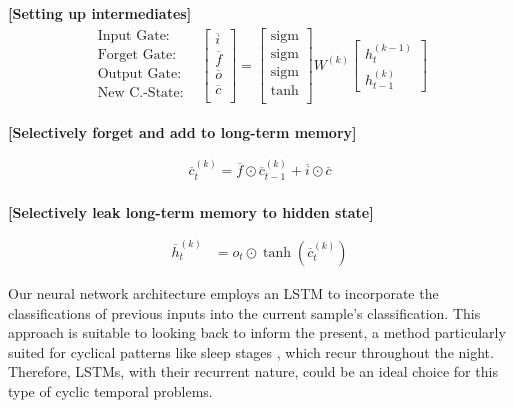 \documentclass{article}
\begin{document}
\vspace{0.5em}

\textbf{[Setting up intermediates]}
\begin{align*}
\begin{matrix}
\text{Input Gate:} \\
\text{Forget Gate:} \\
\text{Output Gate:} \\
\text{New C.-State:} \\
\end{matrix} &\begin{bmatrix}
\overline{i} \\ 
\overline{f} \\
\overline{o} \\
\overline{c} \\
\end{bmatrix} =
\begin{bmatrix}
\text{sigm} \\
\text{sigm} \\
\text{sigm} \\
\tanh \\
\end{bmatrix} W^{(k)}
\begin{bmatrix}
h_{t}^{(k-1)} \\
h_{t-1}^{(k)}
\end{bmatrix}
\end{align*}

\textbf{[Selectively forget and add to long-term memory]}

\begin{equation*}
\begin{aligned}
    \overline{c}^{(k)}_{t} = \overline{f} \odot \overline{c}^{(k)}_{t-1} + \overline{i} \odot \overline{c} \\
\end{aligned}
\end{equation*}

\textbf{[Selectively leak long-term memory to hidden state]}

\begin{equation*}
\begin{aligned}
    \overline{h}^{(k)}_{t} &= o_t \odot \tanh(\overline{c}^{(k)}_{t})
\end{aligned}
\end{equation*}

Our neural network architecture employs an LSTM to incorporate the classifications of previous inputs into the current sample's classification. This approach is suitable to looking back to inform the present, a method particularly suited for cyclical patterns like sleep stages \cite{Stuburic2020}, which recur throughout the night. Therefore, LSTMs, with their recurrent nature, could be an ideal choice for this type of cyclic temporal problems.
\end{document}
